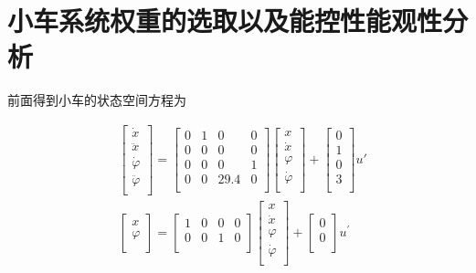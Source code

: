 \section{小车系统权重的选取以及能控性能观性分析}

前面得到小车的状态空间方程为

\begin{equation}
\begin{aligned}
&\begin{bmatrix}
\dot x\\
\ddot x\\
\dot{\varphi}\\
\ddot{\varphi}\\
\end{bmatrix}
=
\begin{bmatrix}
0 & 1 & 0 & 0\\
0 & 0 & 0 & 0\\
0 & 0 & 0 & 1\\
0 & 0 & 29.4 & 0\\
\end{bmatrix}
\begin{bmatrix}
x\\
\dot x\\
\varphi\\
\dot{\varphi}\\
\end{bmatrix}
+
\begin{bmatrix}
0\\
1\\
0\\
3\\
\end{bmatrix}
u'\\
&\begin{bmatrix}
x\\
\varphi\\
\end{bmatrix}
=
\begin{bmatrix}
1 &0 &0 &0\\
0 &0 &1 &0\\
\end{bmatrix}
\begin{bmatrix}
x\\
\dot x\\
\varphi\\
\dot{\varphi}\\
\end{bmatrix}
+
\begin{bmatrix}
0\\
0\\
\end{bmatrix}
u^{'}\\
\end{aligned}
\end{equation}

